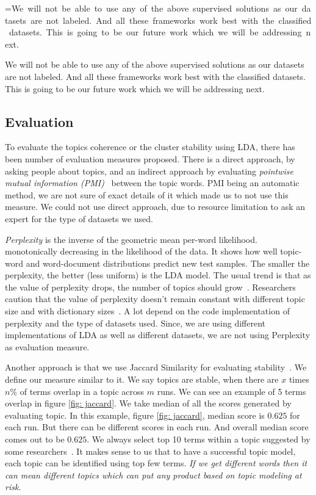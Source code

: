 \documentclass[10pt,conference]{IEEEtran}
\makeatletter
\newcommand{\mybox}[1]{%
  \setbox0=\hbox{#1}%
  \setlength{\@tempdima}{\dimexpr\linewidth}%
  \begin{tcolorbox}[colframe=mycolor,boxrule=0.5pt,arc=4pt,
      left=6pt,right=6pt,top=6pt,bottom=6pt,boxsep=0pt,width=\@tempdima]
    #1
  \end{tcolorbox}
}
\theoremstyle{break}
\makeatother
\begin{document}
\mybox{We will not be able to use any of the above supervised solutions as our datasets are not labeled. And all these frameworks work best with the classified datasets. This is going to be our future work which we will be addressing next.}

\subsection{Evaluation}
\label{sect: evaluation}
To evaluate the topics coherence or the cluster stability using LDA, there has been number of evaluation measures proposed. There is a direct approach, by asking people about topics, and an indirect approach by evaluating \textit{pointwise mutual information (PMI)}~\cite{lau2014machine, o2015analysis} between the topic words. PMI being an automatic method, we are not sure of exact details of it which made us to not use this measure. We could not use direct approach, due to resource limitation to ask an expert for the type of datasets we used.

\textit{Perplexity} is  the inverse of the geometric mean per-word likelihood. monotonically decreasing in the likelihood of the data. It shows how well topic-word and word-document distributions predict new test samples. The smaller the perplexity, the better (less uniform) is the LDA model. The usual trend is that as the value of perplexity drops, the number of topics should grow~\cite{koltcov2014latent}. Researchers caution that the value of perplexity doesn't remain constant with different topic size and with dictionary sizes~\cite{koltcov2014latent, zhao2015heuristic}. A lot depend on the code implementation of perplexity and the type of datasets used. Since, we are using different implementations of LDA as well as different datasets, we are not using Perplexity as evaluation measure.

Another approach is that we use Jaccard Similarity for evaluating stability~\cite{o2015analysis, galvis2013analysis}. We define our measure similar to it. We say topics are stable, when there are $x$ times $n\%$ of terms overlap in a topic across $m$ runs. We can see an example of 5 terms overlap in figure \ref{fig: jaccard}. We take median of all the scores generated by evaluating topic. In this example, figure \ref{fig: jaccard}, median score is $0.625$ for each run. But there can be different scores in each run. And overall median score comes out to be $0.625$. We always select top 10 terms within a topic suggested by some researchers~\cite{panichella2013effectively, lukins2010bug}. It makes sense to us that to have a successful topic model, each topic can be identified using top few terms. \textit{If we get different words then it can mean different topics which can put any product based on topic modeling at risk.}
\end{document}
